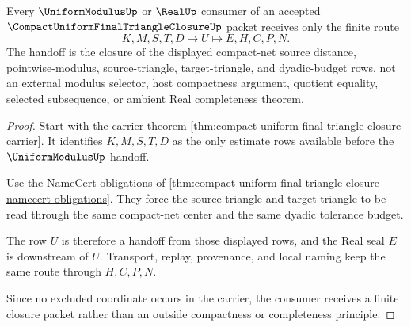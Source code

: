\begin{theorem}
\label{thm:compact-uniform-final-triangle-closure-handoff}
Every $\UniformModulusUp$ or $\RealUp$ consumer of an accepted $\CompactUniformFinalTriangleClosureUp$ packet receives only the finite route
$$
K,M,S,T,D \longmapsto U \longmapsto E,H,C,P,N .
$$
The handoff is the closure of the displayed compact-net source distance, pointwise-modulus, source-triangle, target-triangle, and dyadic-budget rows, not an external modulus selector, host compactness argument, quotient equality, selected subsequence, or ambient Real completeness theorem.
\end{theorem}
\begin{proof}
Start with the carrier theorem \autoref{thm:compact-uniform-final-triangle-closure-carrier}. It identifies $K,M,S,T,D$ as the only estimate rows available before the $\UniformModulusUp$ handoff.

Use the NameCert obligations of \autoref{thm:compact-uniform-final-triangle-closure-namecert-obligations}. They force the source triangle and target triangle to be read through the same compact-net center and the same dyadic tolerance budget.

The row $U$ is therefore a handoff from those displayed rows, and the Real seal $E$ is downstream of $U$. Transport, replay, provenance, and local naming keep the same route through $H,C,P,N$.

Since no excluded coordinate occurs in the carrier, the consumer receives a finite closure packet rather than an outside compactness or completeness principle.
\end{proof}


